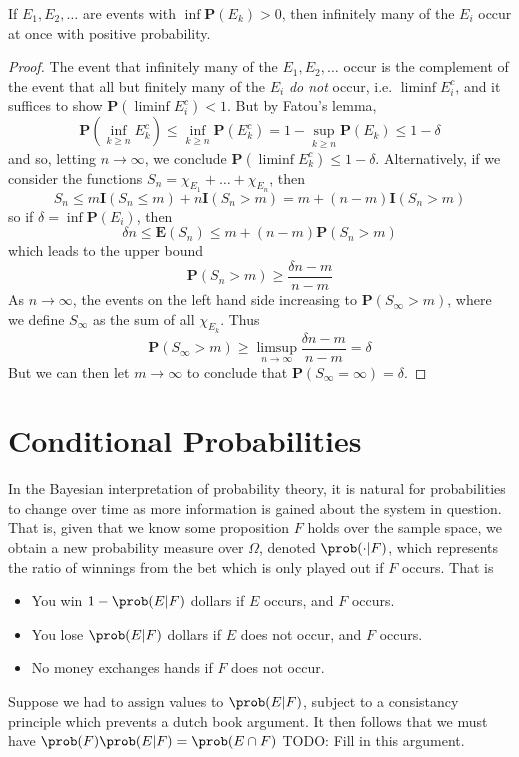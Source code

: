 \begin{theorem}
    If $E_1, E_2, \dots$ are events with $\inf \mathbf{P}(E_k) > 0$, then infinitely many of the $E_i$ occur at once with positive probability.
\end{theorem}
\begin{proof}
    The event that infinitely many of the $E_1, E_2, \dots$ occur is the complement of the event that all but finitely many of the $E_i$ {\it do not} occur, i.e. $\liminf E_i^c$, and it suffices to show $\mathbf{P}(\liminf E_i^c) < 1$. But by Fatou's lemma,
    \[ \mathbf{P} \left(\inf_{k \geq n} E_k^c \right) \leq \inf_{k \geq n} \mathbf{P}(E_k^c) = 1 - \sup_{k \geq n} \mathbf{P}(E_k) \leq 1 - \delta \]
    and so, letting $n \to \infty$, we conclude $\mathbf{P}(\liminf E_k^c) \leq 1 - \delta$. Alternatively, if we consider the functions $S_n = \chi_{E_1} + \dots + \chi_{E_n}$, then
    \[ S_n \leq m \mathbf{I}(S_n \leq m) + n \mathbf{I}(S_n > m) = m + (n - m) \mathbf{I}(S_n > m) \]
    so if $\delta = \inf \mathbf{P}(E_i)$, then
    \[ \delta n \leq \mathbf{E}(S_n) \leq m + (n - m) \mathbf{P}(S_n > m) \]
    which leads to the upper bound
    \[ \mathbf{P}(S_n > m) \geq \frac{\delta n - m}{n - m} \]
    As $n \to \infty$, the events on the left hand side increasing to $\mathbf{P}(S_\infty > m)$, where we define $S_\infty$ as the sum of all $\chi_{E_k}$. Thus
    \[ \mathbf{P}(S_\infty > m) \geq \limsup_{n \to \infty} \frac{\delta n - m}{n - m} = \delta \]
    But we can then let $m \to \infty$ to conclude that $\mathbf{P}(S_\infty = \infty) = \delta$.
\end{proof}

\section{Conditional Probabilities}

In the Bayesian interpretation of probability theory, it is natural for probabilities to change over time as more information is gained about the system in question. That is, given that we know some proposition $F$ holds over the sample space, we obtain a new probability measure over $\Omega$, denoted $\prob( \cdot | F)$, which represents the ratio of winnings from the bet which is only played out if $F$ occurs. That is
%
\begin{itemize}
    \item You win $1-\prob(E|F)$ dollars if $E$ occurs, and $F$ occurs.
    \item You lose $\prob(E|F)$ dollars if $E$ does not occur, and $F$ occurs.
    \item No money exchanges hands if $F$ does not occur.
\end{itemize}
%
Suppose we had to assign values to $\prob(E|F)$, subject to a consistancy principle which prevents a dutch book argument. It then follows that we must have $\prob(F) \prob(E | F) = \prob(E \cap F)$ TODO: Fill in this argument.

